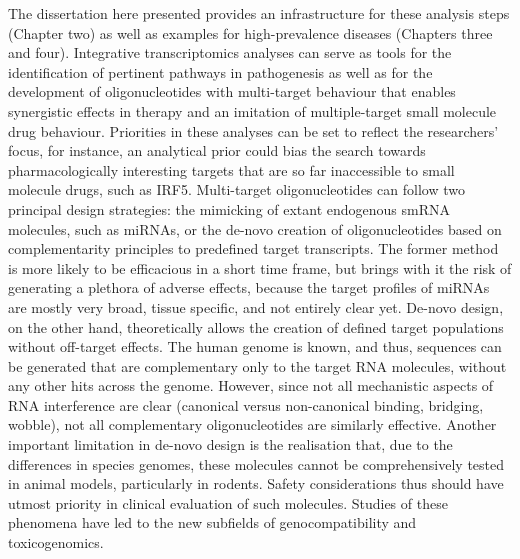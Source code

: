 The dissertation here presented provides an infrastructure for these analysis steps (Chapter two) as well as examples for high-prevalence diseases (Chapters three and four). Integrative transcriptomics analyses can serve as tools for the identification of pertinent pathways in pathogenesis as well as for the development of oligonucleotides with multi-target behaviour that enables synergistic effects in therapy and an imitation of multiple-target small molecule drug behaviour. Priorities in these analyses can be set to reflect the researchers' focus, for instance, an analytical prior could bias the search towards pharmacologically interesting targets that are so far inaccessible to small molecule drugs, such as IRF5.\cite{Almuttaqi2019} Multi-target oligonucleotides can follow two principal design strategies: the mimicking of extant endogenous smRNA molecules, such as miRNAs, or the de-novo creation of oligonucleotides based on complementarity principles to predefined target transcripts. The former method is more likely to be efficacious in a short time frame, but brings with it the risk of generating a plethora of adverse effects, because the target profiles of miRNAs are mostly very broad, tissue specific, and not entirely clear yet. De-novo design, on the other hand, theoretically allows the creation of defined target populations without off-target effects. The human genome is known, and thus, sequences can be generated that are complementary only to the target RNA molecules, without any other hits across the genome. However, since not all mechanistic aspects of RNA interference are clear (canonical versus non-canonical binding, bridging, wobble), not all complementary oligonucleotides are similarly effective. Another important limitation in de-novo design is the realisation that, due to the differences in species genomes, these molecules cannot be comprehensively tested in animal models, particularly in rodents. Safety considerations thus should have utmost priority in clinical evaluation of such molecules. Studies of these phenomena have led to the new subfields of genocompatibility and toxicogenomics.\cite{Akhtar2007}

